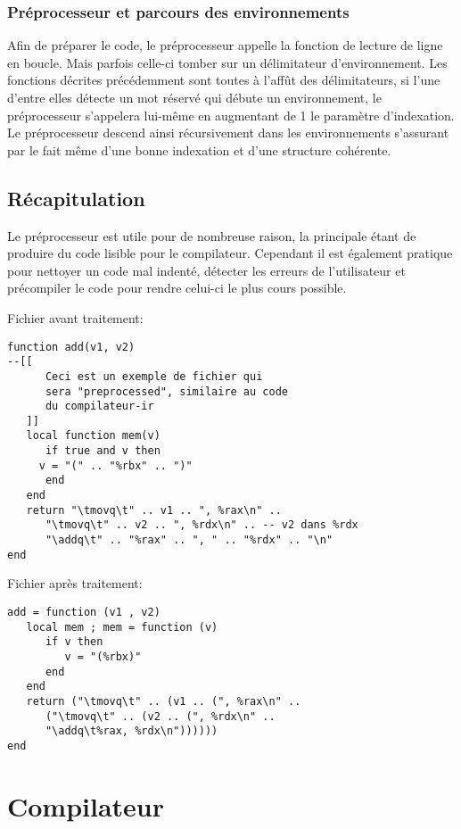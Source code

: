 \documentclass{article}
\begin{document}
\subsubsection{Préprocesseur et parcours des environnements}
Afin de préparer le code, le préprocesseur appelle la fonction de lecture de ligne en boucle. Mais parfois celle-ci tomber sur un délimitateur d'environnement. Les fonctions décrites précédemment sont toutes à l'affût des délimitateurs, si l'une d'entre elles détecte un mot réservé qui débute un environnement, le préprocesseur s'appelera lui-même en augmentant de 1 le paramètre d'indexation. Le préprocesseur descend ainsi récursivement dans les environnements s'assurant par le fait même d'une bonne indexation et d'une structure cohérente.

\newpage
\subsection{Récapitulation}
Le préprocesseur est utile pour de nombreuse raison, la principale étant de produire du code lisible pour le compilateur. Cependant il est également pratique pour nettoyer un code mal indenté, détecter les erreurs de l'utilisateur et précompiler le code pour rendre celui-ci le plus cours possible.

Fichier avant traitement:
\begin{lstlisting}[caption={Récapitulatif des fonctionnalitées},label=DescriptiveLabel]
function add(v1, v2)
--[[ 
      Ceci est un exemple de fichier qui 
      sera "preprocessed", similaire au code
      du compilateur-ir
   ]]
   local function mem(v)
      if true and v then
	 v = "(" .. "%rbx" .. ")"
      end
   end
   return "\tmovq\t" .. v1 .. ", %rax\n" ..
      "\tmovq\t" .. v2 .. ", %rdx\n" .. -- v2 dans %rdx
      "\addq\t" .. "%rax" .. ", " .. "%rdx" .. "\n"
end
\end{lstlisting}

Fichier après traitement:
\begin{lstlisting}[belowcaptionskip = -1\baselineskip]
add = function (v1 , v2) 
   local mem ; mem = function (v) 
      if v then 
         v = "(%rbx)" 
      end 
   end 
   return ("\tmovq\t" .. (v1 .. (", %rax\n" .. 
      ("\tmovq\t" .. (v2 .. (", %rdx\n" .. 
      "\addq\t%rax, %rdx\n")))))) 
end 
\end{lstlisting}

\newpage
\section{Compilateur}
\end{document}
